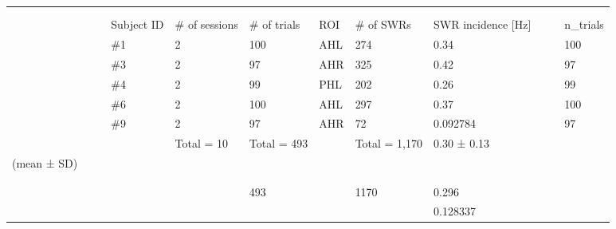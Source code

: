 \documentclass[a4paper]{article}
\begin{document}
\begin{tabular}{|l|l|l|l|l|l|l|l|l|l|l|l|}
\hline
&&&&&&&&&&&\\
\hline
&&&&&&&&&&&\\
\hline
&&&&&&&&&&&\\
\hline
&&&Subject ID&\# of sessions&\# of trials&ROI&\# of SWRs&SWR incidence [Hz]&&&n\_trials\\
\hline
&&&\#1&2&100&AHL&274&0.34&&&100\\
\hline
&&&\#3&2&97&AHR&325&0.42&&&97\\
\hline
&&&\#4&2&99&PHL&202&0.26&&&99\\
\hline
&&&\#6&2&100&AHL&297&0.37&&&100\\
\hline
&&&\#9&2&97&AHR&72&0.092784&&&97\\
\hline
&&&&Total = 10&Total = 493&&Total = 1,170&0.30 ± 0.13&&&\\
\hline
(mean ± SD)&&&&&&&&&&&\\
\hline
&&&&&&&&&&&\\
\hline
&&&&&&&&&&&\\
\hline
&&&&&493&&1170&0.296&&&\\
\hline
&&&&&&&&0.128337&&&\\
\hline
\end{tabular}
\end{document}
